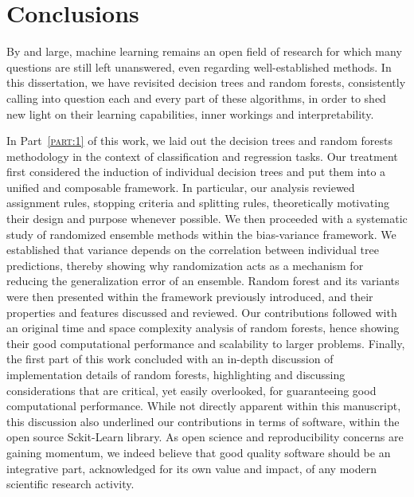\chapter{Conclusions}\label{ch:conclusions}

By and large, machine learning remains an open field of research for which many
questions are still left unanswered, even regarding well-established methods.
In this dissertation, we have revisited decision trees and random forests,
consistently calling into question each and every part of these algorithms, in
order to shed new light on their learning capabilities, inner workings and
interpretability.

In Part~\textsc{\ref{part:1}} of this work, we laid out the decision trees and
random forests methodology in the context of classification and regression
tasks. Our treatment first considered the induction of individual decision
trees and put them into a unified and composable framework. In particular, our
analysis reviewed assignment rules, stopping criteria and splitting rules,
theoretically motivating their design and purpose whenever possible. We then
proceeded with a systematic study of randomized ensemble methods within the
bias-variance framework. We established that variance depends on the
correlation between individual tree predictions, thereby showing why
randomization acts as a mechanism for reducing the generalization error of an
ensemble.  Random forest and its variants were then presented within the
framework previously introduced, and their properties and features discussed
and reviewed. Our contributions followed with an original time and space
complexity analysis of random forests, hence showing their good computational
performance and scalability to larger problems. Finally, the first part of this
work concluded with an in-depth discussion of implementation details of random
forests, highlighting and discussing considerations that are critical, yet
easily overlooked, for guaranteeing good computational performance. While not
directly apparent within this manuscript, this discussion also underlined our
contributions in terms of software, within the open source Sckit-Learn library.
As open science and reproducibility concerns are gaining momentum, we indeed
believe that good quality software should be an integrative part, acknowledged
for its own value and impact, of any modern scientific research activity.

